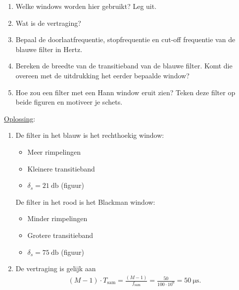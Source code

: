\documentclass{kuburgiearticle}
\begin{document}
	\begin{enumerate}
		\item Welke windows worden hier gebruikt? Leg uit.
		\item Wat is de vertraging?
		\item Bepaal de doorlaatfrequentie, stopfrequentie en cut-off frequentie van de blauwe filter in Hertz.
		\item Bereken de breedte van de transitieband van de blauwe filter. Komt die overeen met de uitdrukking het eerder bepaalde window?
		\item Hoe zou een filter met een Hann window eruit zien? Teken deze filter op beide figuren en motiveer je schets.
	\end{enumerate}

	\underline{Oplossing}:

	\begin{enumerate}
		\item De filter in het blauw is het rechthoekig window: \begin{itemize}
			\item Meer rimpelingen
			\item Kleinere transitieband
			\item \(\delta_s = \SI{21}{\decibel}\) (figuur)
		\end{itemize}

		De filter in het rood is het Blackman window: \begin{itemize}
			\item Minder rimpelingen
			\item Grotere transitieband
			\item \(\delta_s = \SI{75}{\decibel}\) (figuur)
		\end{itemize}

		\item De vertraging is gelijk aan \begin{align*}
			(M-1) \cdot T_\text{sam} = \frac{(M-1)}{f_\text{sam}} = \frac{50}{100 \cdot 10^{6}} = \SI{50}{\micro\second}.
		\end{align*}


\end{enumerate}
\end{document}
